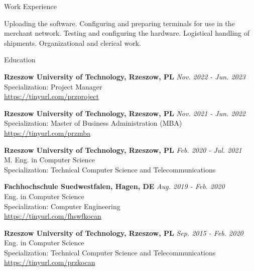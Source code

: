 \documentclass{resume}
\begin{document}
\begin{rSection}{Work Experience}
\begin{rSubsection}
        \item[] {Uploading the software. Configuring and preparing terminals for use in the merchant
                    network. Testing and configuring the hardware. Logistical handling of shipments. Organizational and clerical work.}

    \end{rSubsection}

\end{rSection}

\begin{rSection}{Education}

    {\bf Rzeszow University of Technology, Rzeszow, PL} \hfill {\em Nov. 2022 - Jun. 2023} \\
    Specialization: Project Manager \\
    \url{https://tinyurl.com/przproject}

    {\bf Rzeszow University of Technology, Rzeszow, PL} \hfill {\em Nov. 2021 - Jun. 2022} \\
    Specialization: Master of Business Administration (MBA) \\
    \url{https://tinyurl.com/przmba}

    {\bf Rzeszow University of Technology, Rzeszow, PL} \hfill {\em Feb. 2020 - Jul. 2021} \\
    M. Eng. in Computer Science \\
    Specialization: Technical Computer Science and Telecommunications

    {\bf Fachhochschule Suedwestfalen, Hagen, DE} \hfill {\em Aug. 2019 - Feb. 2020} \\
    Eng. in Computer Science \\
    Specialization: Computer Engineering \\
    \url{https://tinyurl.com/fhswfkocan}

    {\bf Rzeszow University of Technology, Rzeszow, PL} \hfill {\em Sep. 2015 - Feb. 2020} \\
    Eng. in Computer Science \\
    Specialization: Technical Computer Science and Telecommunications \\
    \url{https://tinyurl.com/przkocan}

\end{rSection}
\end{document}
